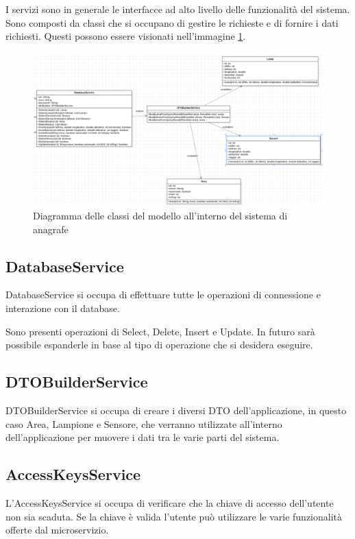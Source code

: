 I servizi sono in generale le interfacce ad alto livello delle funzionalità del sistema. Sono composti da classi che si occupano di gestire le richieste e di fornire i dati richiesti.
Questi possono essere visionati nell'immagine \ref{fig:services_anagrafe}.

\begin{figure}[ht]
    \centering
    \includegraphics[width=\textwidth]{img/services_anagrafe.png}
    \caption{Diagramma delle classi del modello all'interno del sistema di anagrafe}
    \label{fig:services_anagrafe}
\end{figure}

\subsection{DatabaseService}

DatabaseService si occupa di effettuare tutte le operazioni di connessione e interazione con il database. 

Sono presenti operazioni di Select, Delete, Insert e Update. In futuro sarà possibile espanderle in base al tipo di operazione che si desidera eseguire.

\subsection{DTOBuilderService}
DTOBuilderService si occupa di creare i diversi DTO dell'applicazione, in questo caso Area, Lampione e Sensore, che verranno utilizzate all'interno dell'applicazione per muovere i dati tra le varie parti del sistema.

\subsection{AccessKeysService}
L'AccessKeysService si occupa di verificare che la chiave di accesso dell'utente non sia scaduta. Se la chiave è valida l'utente può utilizzare le varie funzionalità offerte dal microservizio.

